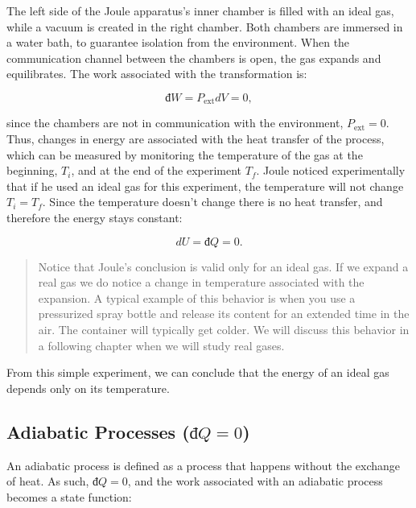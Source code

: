 \documentclass[
]{book}
\theoremstyle{definition}
\theoremstyle{definition}
\theoremstyle{definition}
\theoremstyle{remark}
\begin{document}
The left side of the Joule apparatus's inner chamber is filled with an ideal gas, while a vacuum is created in the right chamber. Both chambers are immersed in a water bath, to guarantee isolation from the environment. When the communication channel between the chambers is open, the gas expands and equilibrates. The work associated with the transformation is:

\begin{equation}
  đ W=P_{\text{ext}}dV = 0,
  \label{eq:JexpW}
\end{equation}

since the chambers are not in communication with the environment, \(P_{\text{ext}}=0\). Thus, changes in energy are associated with the heat transfer of the process, which can be measured by monitoring the temperature of the gas at the beginning, \(T_i\), and at the end of the experiment \(T_f\). Joule noticed experimentally that if he used an ideal gas for this experiment, the temperature will not change \(T_i = T_f\). Since the temperature doesn't change there is no heat transfer, and therefore the energy stays constant:

\begin{equation}
  dU = đ Q = 0.
  \label{eq:JexpQU}
\end{equation}

\begin{quote}
Notice that Joule's conclusion is valid only for an ideal gas. If we expand a real gas we do notice a change in temperature associated with the expansion. A typical example of this behavior is when you use a pressurized spray bottle and release its content for an extended time in the air. The container will typically get colder. We will discuss this behavior in a following chapter when we will study real gases.
\end{quote}

From this simple experiment, we can conclude that the energy of an ideal gas depends only on its temperature.

\hypertarget{adiabatic-processes-ux111q0}{%
\subsection{\texorpdfstring{Adiabatic Processes (\(đQ=0\))}{Adiabatic Processes (đQ=0)}}\label{adiabatic-processes-ux111q0}}

An adiabatic process is defined as a process that happens without the exchange of heat. As such, \(đ Q=0\), and the work associated with an adiabatic process becomes a state function:
\end{document}
